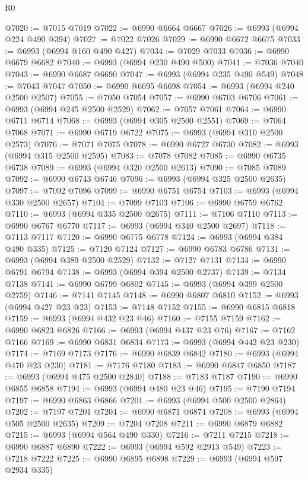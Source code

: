 \begin{lexlean}{R0}
\begin{coremodule}
@7020 := @7015 @7019
@7022 := @6990 @6664 @6667
@7026 := @6993 (@6994 @224 @490 @394)
@7027 := @7022 @7026
@7029 := @6990 @6672 @6675
@7033 := @6993 (@6994 @160 @490 @427)
@7034 := @7029 @7033
@7036 := @6990 @6679 @6682
@7040 := @6993 (@6994 @230 @490 @500)
@7041 := @7036 @7040
@7043 := @6990 @6687 @6690
@7047 := @6993 (@6994 @235 @490 @549)
@7048 := @7043 @7047
@7050 := @6990 @6695 @6698
@7054 := @6993 (@6994 @240 @2500 @2507)
@7055 := @7050 @7054
@7057 := @6990 @6703 @6706
@7061 := @6993 (@6994 @245 @2500 @2529)
@7062 := @7057 @7061
@7064 := @6990 @6711 @6714
@7068 := @6993 (@6994 @305 @2500 @2551)
@7069 := @7064 @7068
@7071 := @6990 @6719 @6722
@7075 := @6993 (@6994 @310 @2500 @2573)
@7076 := @7071 @7075
@7078 := @6990 @6727 @6730
@7082 := @6993 (@6994 @315 @2500 @2595)
@7083 := @7078 @7082
@7085 := @6990 @6735 @6738
@7089 := @6993 (@6994 @320 @2500 @2613)
@7090 := @7085 @7089
@7092 := @6990 @6743 @6746
@7096 := @6993 (@6994 @325 @2500 @2635)
@7097 := @7092 @7096
@7099 := @6990 @6751 @6754
@7103 := @6993 (@6994 @330 @2500 @2657)
@7104 := @7099 @7103
@7106 := @6990 @6759 @6762
@7110 := @6993 (@6994 @335 @2500 @2675)
@7111 := @7106 @7110
@7113 := @6990 @6767 @6770
@7117 := @6993 (@6994 @340 @2500 @2697)
@7118 := @7113 @7117
@7120 := @6990 @6775 @6778
@7124 := @6993 (@6994 @384 @490 @335)
@7125 := @7120 @7124
@7127 := @6990 @6783 @6786
@7131 := @6993 (@6994 @389 @2500 @2529)
@7132 := @7127 @7131
@7134 := @6990 @6791 @6794
@7138 := @6993 (@6994 @394 @2500 @2737)
@7139 := @7134 @7138
@7141 := @6990 @6799 @6802
@7145 := @6993 (@6994 @399 @2500 @2759)
@7146 := @7141 @7145
@7148 := @6990 @6807 @6810
@7152 := @6993 (@6994 @427 @23 @23)
@7153 := @7148 @7152
@7155 := @6990 @6815 @6818
@7159 := @6993 (@6994 @432 @23 @46)
@7160 := @7155 @7159
@7162 := @6990 @6823 @6826
@7166 := @6993 (@6994 @437 @23 @76)
@7167 := @7162 @7166
@7169 := @6990 @6831 @6834
@7173 := @6993 (@6994 @442 @23 @230)
@7174 := @7169 @7173
@7176 := @6990 @6839 @6842
@7180 := @6993 (@6994 @470 @23 @230)
@7181 := @7176 @7180
@7183 := @6990 @6847 @6850
@7187 := @6993 (@6994 @475 @2500 @2840)
@7188 := @7183 @7187
@7190 := @6990 @6855 @6858
@7194 := @6993 (@6994 @480 @23 @46)
@7195 := @7190 @7194
@7197 := @6990 @6863 @6866
@7201 := @6993 (@6994 @500 @2500 @2864)
@7202 := @7197 @7201
@7204 := @6990 @6871 @6874
@7208 := @6993 (@6994 @505 @2500 @2635)
@7209 := @7204 @7208
@7211 := @6990 @6879 @6882
@7215 := @6993 (@6994 @564 @490 @330)
@7216 := @7211 @7215
@7218 := @6990 @6887 @6890
@7222 := @6993 (@6994 @592 @2913 @549)
@7223 := @7218 @7222
@7225 := @6990 @6895 @6898
@7229 := @6993 (@6994 @597 @2934 @335)

\end{coremodule}
\end{lexlean}
